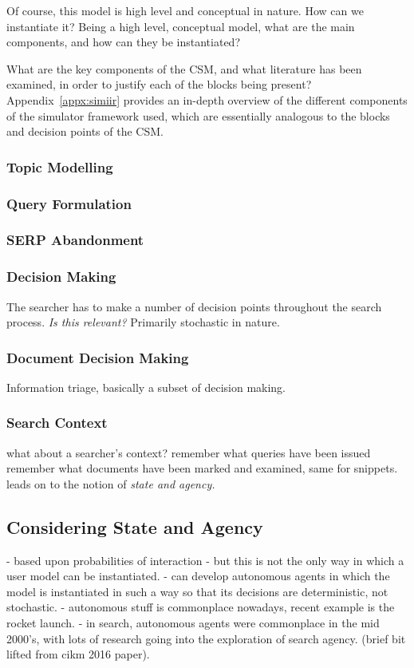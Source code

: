 Of course, this model is high level and conceptual in nature. How can we instantiate it?
Being a high level, conceptual model, what are the main components, and how can they be instantiated?

What are the key components of the CSM, and what literature has been examined, in order to justify each of the blocks being present? Appendix~\ref{appx:simiir} provides an in-depth overview of the different components of the simulator framework used, which are essentially analogous to the blocks and decision points of the CSM.

\subsubsection{Topic Modelling}

\subsubsection{Query Formulation}

\subsubsection{SERP Abandonment}

\subsubsection{Decision Making}
The searcher has to make a number of decision points throughout the search process.
\emph{Is this relevant?}
Primarily stochastic in nature.

\subsubsection{Document Decision Making}
Information triage, basically a subset of decision making.

\subsubsection{Search Context}
what about a searcher's context?
remember what queries have been issued
remember what documents have been marked and examined, same for snippets.
leads on to the notion of \emph{state and agency.}

\subsection{Considering State and Agency}
- based upon probabilities of interaction
- but this is not the only way in which a user model can be instantiated.
- can develop autonomous agents in which the model is instantiated in such a way so that its decisions are deterministic, not stochastic.
- autonomous stuff is commonplace nowadays, recent example is the rocket launch.
- in search, autonomous agents were commonplace in the mid 2000's, with lots of research going into the exploration of search agency. (brief bit lifted from cikm 2016 paper).

